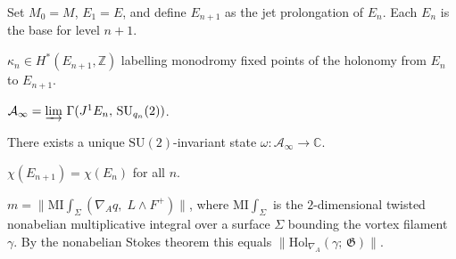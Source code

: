 \begin{definition}
  \label{def:recursive-brane-tower}
  Set $M_0 = M$, $E_1 = E$, and define $E_{n+1}$ as the jet
  prolongation of $E_n$.  Each $E_n$ is the base for level $n+1$.
\end{definition}

\begin{definition}
  \label{def:quantum-characteristic-classes}
  $\kappa_n \in H^*(E_{n+1}, \mathbb{Z})$ labelling monodromy
  fixed points of the holonomy from $E_n$ to $E_{n+1}$.
\end{definition}

\begin{definition}
  \label{def:direct-limit-algebra}
  $\mathcal{A}_\infty = \varinjlim\,\Gamma(J^1 E_n,\,\mathrm{SU}_{q_n}(2))$.
\end{definition}

\begin{proposition}
  \label{prop:vacuum-state}
  There exists a unique $\mathrm{SU}(2)$-invariant state
  $\omega : \mathcal{A}_\infty \to \mathbb{C}$.
\end{proposition}

\begin{proposition}
  \label{prop:euler-char-stability}
  $\chi(E_{n+1}) = \chi(E_n)$ for all $n$.
\end{proposition}

\begin{definition}
  \label{def:mass-identity}
  $m = \lVert\mathrm{MI}\!\int_\Sigma (\nabla_A q,\; L \wedge F^+)\rVert$,
  where $\mathrm{MI}\!\int_\Sigma$ is the $2$-dimensional twisted nonabelian
  multiplicative integral over a surface $\Sigma$ bounding the vortex
  filament~$\gamma$.  By the nonabelian Stokes theorem this equals
  $\lVert\mathrm{Hol}_{\nabla_A}(\gamma;\,\mathfrak{G})\rVert$.
\end{definition}

